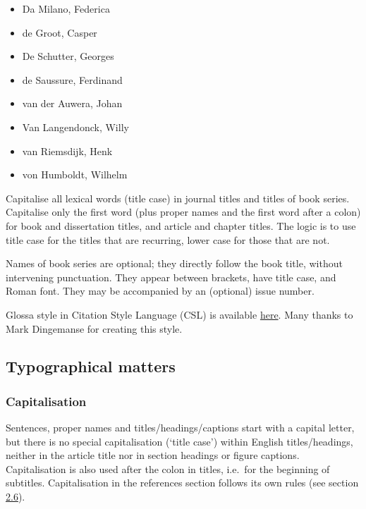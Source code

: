 \documentclass[cm,linguex]{glossa}
\begin{document}
\begin{itemize}
\item
  Da Milano, Federica
\item
  de Groot, Casper
\item
  De Schutter, Georges
\item
  de Saussure, Ferdinand
\item
  van der Auwera, Johan
\item
  Van Langendonck, Willy
\item
  van Riemsdijk, Henk
\item
  von Humboldt, Wilhelm
\end{itemize}

Capitalise all lexical words (title case) in journal titles and titles
of book series. Capitalise only the first word (plus proper names and
the first word after a colon) for book and dissertation titles, and
article and chapter titles. The logic is to use title case for the
titles that are recurring, lower case for those that are not.

Names of book series are optional; they directly follow the book title,
without intervening punctuation. They appear between brackets, have
title case, and Roman font. They may be accompanied by an (optional)
issue number.

Glossa style in Citation Style Language (CSL) is available
\href{https://www.zotero.org/styles?q=Glossa}{here}. Many thanks to Mark
Dingemanse for creating this style.

\hypertarget{typographical-matters}{%
\subsection{Typographical matters}\label{typographical-matters}}

\hypertarget{capitalisation}{%
\subsubsection{Capitalisation}\label{capitalisation}}

Sentences, proper names and titles/headings/captions start with a
capital letter, but there is no special capitalisation (`title case')
within English titles/headings, neither in the article title nor in
section headings or figure captions. Capitalisation is also used after
the colon in titles, i.e.~for the beginning of subtitles. Capitalisation
in the references section follows its own rules (see section
\protect\hyperlink{sec:refs}{2.6}).
\end{document}
